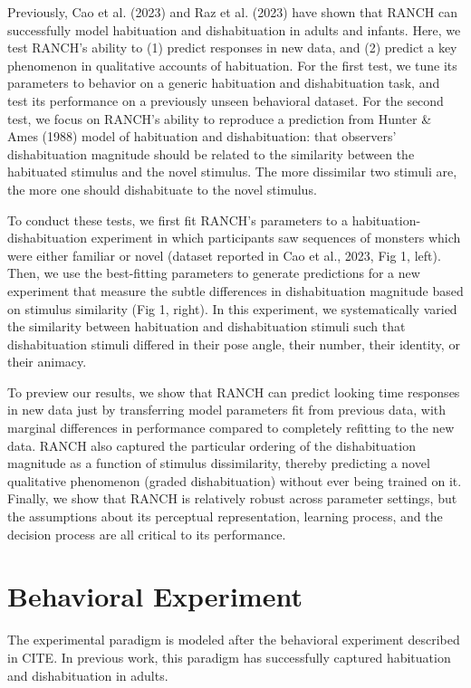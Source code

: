 \documentclass[10pt, letterpaper]{article}
\begin{document}
Previously, Cao et al. (2023) and Raz et al. (2023) have shown that
RANCH can successfully model habituation and dishabituation in adults
and infants. Here, we test RANCH's ability to (1) predict responses in
new data, and (2) predict a key phenomenon in qualitative accounts of
habituation. For the first test, we tune its parameters to behavior on a
generic habituation and dishabituation task, and test its performance on
a previously unseen behavioral dataset. For the second test, we focus on
RANCH's ability to reproduce a prediction from Hunter \& Ames (1988)
model of habituation and dishabituation: that observers' dishabituation
magnitude should be related to the similarity between the habituated
stimulus and the novel stimulus. The more dissimilar two stimuli are,
the more one should dishabituate to the novel stimulus.

To conduct these tests, we first fit RANCH's parameters to a
habituation-dishabituation experiment in which participants saw
sequences of monsters which were either familiar or novel (dataset
reported in Cao et al., 2023, Fig 1, left). Then, we use the
best-fitting parameters to generate predictions for a new experiment
that measure the subtle differences in dishabituation magnitude based on
stimulus similarity (Fig 1, right). In this experiment, we
systematically varied the similarity between habituation and
dishabituation stimuli such that dishabituation stimuli differed in
their pose angle, their number, their identity, or their animacy.

To preview our results, we show that RANCH can predict looking time
responses in new data just by transferring model parameters fit from
previous data, with marginal differences in performance compared to
completely refitting to the new data. RANCH also captured the particular
ordering of the dishabituation magnitude as a function of stimulus
dissimilarity, thereby predicting a novel qualitative phenomenon (graded
dishabituation) without ever being trained on it. Finally, we show that
RANCH is relatively robust across parameter settings, but the
assumptions about its perceptual representation, learning process, and
the decision process are all critical to its performance.

\hypertarget{behavioral-experiment}{%
\section{Behavioral Experiment}\label{behavioral-experiment}}

The experimental paradigm is modeled after the behavioral experiment
described in CITE. In previous work, this paradigm has successfully
captured habituation and dishabituation in adults.
\end{document}
